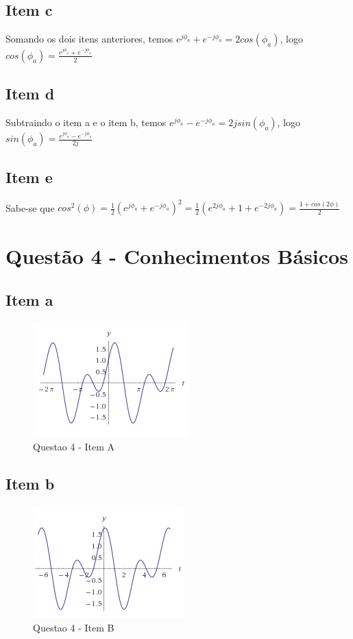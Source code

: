 \documentclass[a4paper, 12pt]{article}
\begin{document}
        \subsection{Item c}
        Somando os dois itens anteriores, temos $e^{j\phi_{a}} + e^{-j\phi_{a}} = 2cos(\phi_{a})$, logo $cos(\phi_{a}) = \frac{e^{j\phi_{a}} + e^{-j\phi_{a}}}{2}$
        \subsection{Item d}
        Subtraindo o item a e o item b, temos $e^{j\phi_{a}} - e^{-j\phi_{a}} = 2jsin(\phi_{a})$, logo $sin(\phi_{a}) = \frac{e^{j\phi_{a}} - e^{-j\phi_{a}}}{2j}$        
        \subsection{Item e}
        Sabe-se que $cos^{2}(\phi) = \frac{1}{2}(e^{j\phi_{a}} + e^{-j\phi_{a}})^{2} = \frac{1}{2}(e^{2j\phi_{a}} + 1 + e^{-2j\phi_{a}}) = \frac{1+cos(2\phi)}{2}$
    \section{Quest\~{a}o 4 - Conhecimentos Básicos}
        \subsection{Item a}
            \begin{figure}[!ht]
            	\centering
            	\includegraphics{img/Figura6.PNG}
            	\caption{Questao 4 - Item A}
            \end{figure}        
        \subsection{Item b}
            \begin{figure}[!ht]
            	\centering
            	\includegraphics{img/Figura7.PNG}
            	\caption{Questao 4 - Item B}
            \end{figure}                
            \newpage
\end{document}
